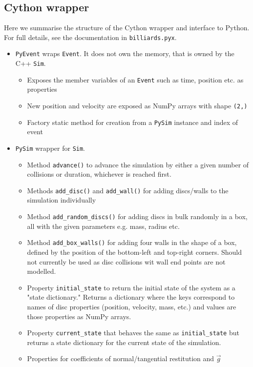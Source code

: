 \documentclass{article}
\begin{document}
\subsection{Cython wrapper}
Here we summarise the structure of the Cython wrapper and interface to Python. For full details, see the documentation in \texttt{billiards.pyx}.
\begin{itemize}
    \item \texttt{PyEvent} wraps \texttt{Event}. It does not own the memory, that is owned by the C++ \texttt{Sim}.
    \begin{itemize}
        \item Exposes the member variables of an \texttt{Event} such as time, position etc. as properties
        \item New position and velocity are exposed as NumPy arrays with shape \texttt{(2,)}
        \item Factory static method for creation from a \texttt{PySim} instance and index of event
    \end{itemize}
    \item \texttt{PySim} wrapper for \texttt{Sim}.
    \begin{itemize}
        \item Method \texttt{advance()} to advance the simulation by either a given number of collisions or duration, whichever is reached first.
        \item Methods \texttt{add\_disc()} and \texttt{add\_wall()} for adding discs/walls to the simulation individually
        \item Method \texttt{add\_random\_discs()} for adding discs in bulk randomly in a box, all with the given parameters e.g. mass, radius etc.
        \item Method \texttt{add\_box\_walls()} for adding four walls in the shape of a box, defined by the position of the bottom-left and top-right corners. Should not currently be used as disc collisions wit wall end points are not modelled.
        \item Property \texttt{initial\_state} to return the initial state of the system as a "state dictionary." Returns a dictionary where the keys correspond to names of disc properties (position, velocity, mass, etc.) and values are those properties as NumPy arrays.
        \item Property \texttt{current\_state} that behaves the same as \texttt{initial\_state} but returns a state dictionary for the current state of the simulation.
        \item Properties for coefficients of normal/tangential restitution and $\vec{g}$

\end{itemize}
\end{itemize}
\end{document}
